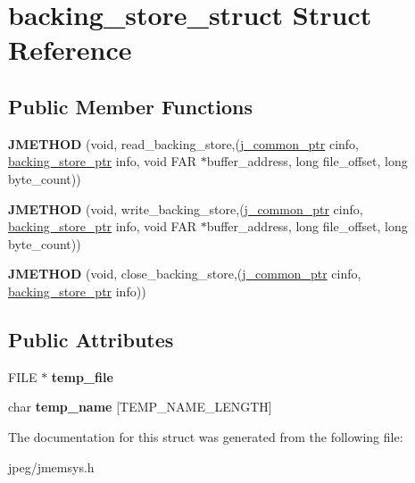 \hypertarget{structbacking__store__struct}{}\section{backing\+\_\+store\+\_\+struct Struct Reference}
\label{structbacking__store__struct}
\subsection*{Public Member Functions}
\begin{DoxyCompactItemize}
\item 
{\bfseries J\+M\+E\+T\+H\+OD} (void, read\+\_\+backing\+\_\+store,(\hyperlink{structjpeg__common__struct}{j\+\_\+common\+\_\+ptr} cinfo,           \hyperlink{structbacking__store__struct}{backing\+\_\+store\+\_\+ptr} info,           void F\+AR $\ast$buffer\+\_\+address,           long file\+\_\+offset, long byte\+\_\+count))\hypertarget{structbacking__store__struct_ad58779ce45c16137542c515bae4ced24}{}\label{structbacking__store__struct_ad58779ce45c16137542c515bae4ced24}

\item 
{\bfseries J\+M\+E\+T\+H\+OD} (void, write\+\_\+backing\+\_\+store,(\hyperlink{structjpeg__common__struct}{j\+\_\+common\+\_\+ptr} cinfo,               \hyperlink{structbacking__store__struct}{backing\+\_\+store\+\_\+ptr} info,               void F\+AR $\ast$buffer\+\_\+address,               long file\+\_\+offset, long byte\+\_\+count))\hypertarget{structbacking__store__struct_aa3b39e9976dd4aa3df6422b47150331e}{}\label{structbacking__store__struct_aa3b39e9976dd4aa3df6422b47150331e}

\item 
{\bfseries J\+M\+E\+T\+H\+OD} (void, close\+\_\+backing\+\_\+store,(\hyperlink{structjpeg__common__struct}{j\+\_\+common\+\_\+ptr} cinfo,               \hyperlink{structbacking__store__struct}{backing\+\_\+store\+\_\+ptr} info))\hypertarget{structbacking__store__struct_a92b4c74e0c61147e9a194e4740eaec09}{}\label{structbacking__store__struct_a92b4c74e0c61147e9a194e4740eaec09}

\end{DoxyCompactItemize}
\subsection*{Public Attributes}
\begin{DoxyCompactItemize}
\item 
F\+I\+LE $\ast$ {\bfseries temp\+\_\+file}\hypertarget{structbacking__store__struct_a90903f2f62f4fe65ac65599b50d0411e}{}\label{structbacking__store__struct_a90903f2f62f4fe65ac65599b50d0411e}

\item 
char {\bfseries temp\+\_\+name} \mbox{[}T\+E\+M\+P\+\_\+\+N\+A\+M\+E\+\_\+\+L\+E\+N\+G\+TH\mbox{]}\hypertarget{structbacking__store__struct_aee24b7268410bcf129e83a8e2a2f4d45}{}\label{structbacking__store__struct_aee24b7268410bcf129e83a8e2a2f4d45}

\end{DoxyCompactItemize}


The documentation for this struct was generated from the following file\+:\begin{DoxyCompactItemize}
\item 
jpeg/jmemsys.\+h\end{DoxyCompactItemize}
